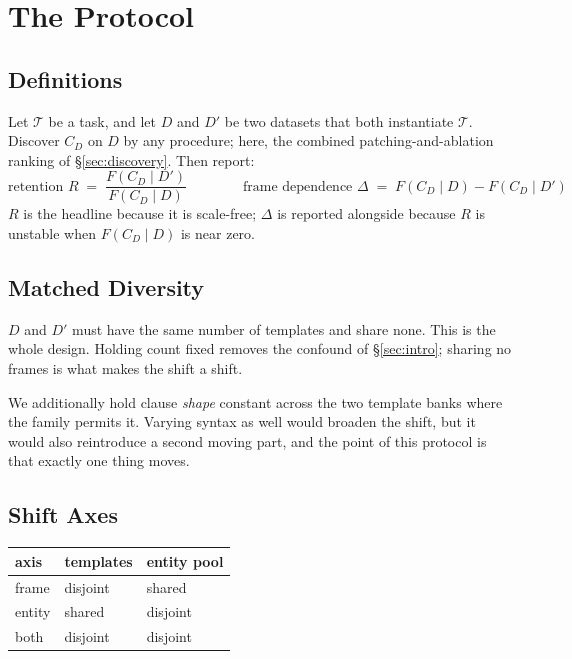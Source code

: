 \documentclass[11pt,a4paper]{article}
\newcommand{\FD}{F(C_D \!\mid\! D)}
\newcommand{\FDp}{F(C_D \!\mid\! D')}
\begin{document}
\section{The Protocol}
\label{sec:protocol}

\subsection{Definitions}

Let $\mathcal{T}$ be a task, and let $D$ and $D'$ be two datasets that both instantiate
$\mathcal{T}$. Discover $C_D$ on $D$ by any procedure; here, the combined
patching-and-ablation ranking of \S\ref{sec:discovery}. Then report:
\[
  \text{retention } R \;=\; \frac{\FDp}{\FD}
  \qquad\qquad
  \text{frame dependence } \Delta \;=\; \FD - \FDp
\]
$R$ is the headline because it is scale-free; $\Delta$ is reported alongside because
$R$ is unstable when $\FD$ is near zero.

\subsection{Matched Diversity}

$D$ and $D'$ must have the same number of templates and share none. This is the whole
design. Holding count fixed removes the confound of \S\ref{sec:intro}; sharing no
frames is what makes the shift a shift.

We additionally hold clause \emph{shape} constant across the two template banks where
the family permits it. Varying syntax as well would broaden the shift, but it would
also reintroduce a second moving part, and the point of this protocol is that exactly
one thing moves.

\subsection{Shift Axes}
\label{sec:axes}

\begin{center}
\begin{tabular}{lll}
\toprule
axis & templates & entity pool \\
\midrule
frame  & disjoint & shared \\
entity & shared   & disjoint \\
both   & disjoint & disjoint \\
\bottomrule
\end{tabular}
\end{center}
\end{document}
